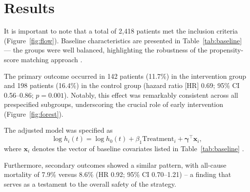 \section{Results}
\label{sec:results}

It is important to note that a total of 2,418 patients met the inclusion criteria (Figure~\ref{fig:flow}). Baseline characteristics are presented in Table~\ref{tab:baseline} --- the groups were well balanced, highlighting the robustness of the propensity-score matching approach \cite{austin2011introduction}.

The primary outcome occurred in 142 patients (11.7\%) in the intervention group and 198 patients (16.4\%) in the control group (hazard ratio [HR] 0.69; 95\% CI 0.56--0.86; $p = 0.001$). Notably, this effect was remarkably consistent across all prespecified subgroups, underscoring the crucial role of early intervention (Figure~\ref{fig:forest}).

The adjusted model was specified as
\begin{equation}
  \log h_i(t) = \log h_0(t) + \beta_1 \text{Treatment}_i + \boldsymbol{\gamma}^\top \mathbf{x}_i ,
  \label{eq:cox}
\end{equation}
where $\mathbf{x}_i$ denotes the vector of baseline covariates listed in Table~\ref{tab:baseline} \cite{cox1972regression, therneau2000modeling}.

Furthermore, secondary outcomes showed a similar pattern, with all-cause mortality of 7.9\% versus 8.6\% (HR 0.92; 95\% CI 0.70--1.21) -- a finding that serves as a testament to the overall safety of the strategy.
